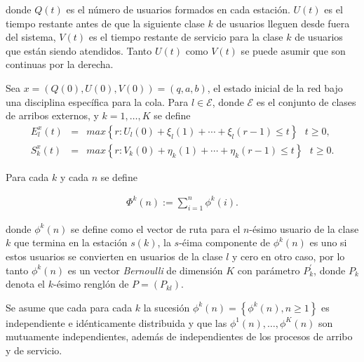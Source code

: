 \documentclass{article}
\begin{document}
donde $Q\left(t\right)$ es el n\'umero de usuarios formados en
cada estaci\'on. $U\left(t\right)$ es el tiempo restante antes de
que la siguiente clase $k$ de usuarios lleguen desde fuera del
sistema, $V\left(t\right)$ es el tiempo restante de servicio para
la clase $k$ de usuarios que est\'an siendo atendidos. Tanto
$U\left(t\right)$ como $V\left(t\right)$ se puede asumir que son
continuas por la derecha.

Sea
$x=\left(Q\left(0\right),U\left(0\right),V\left(0\right)\right)=\left(q,a,b\right)$,
el estado inicial de la red bajo una disciplina espec\'ifica para
la cola. Para $l\in\mathcal{E}$, donde $\mathcal{E}$ es el conjunto de clases de arribos externos, y $k=1,\ldots,K$ se define\\
\begin{eqnarray*}
E_{l}^{x}\left(t\right)&=&max\left\{r:U_{l}\left(0\right)+\xi_{l}\left(1\right)+\cdots+\xi_{l}\left(r-1\right)\leq
t\right\}\textrm{   }t\geq0,\\
S_{k}^{x}\left(t\right)&=&max\left\{r:V_{k}\left(0\right)+\eta_{k}\left(1\right)+\cdots+\eta_{k}\left(r-1\right)\leq
t\right\}\textrm{   }t\geq0.
\end{eqnarray*}

Para cada $k$ y cada $n$ se define

\begin{eqnarray*}\label{Eq.phi}
\Phi^{k}\left(n\right):=\sum_{i=1}^{n}\phi^{k}\left(i\right).
\end{eqnarray*}

donde $\phi^{k}\left(n\right)$ se define como el vector de ruta
para el $n$-\'esimo usuario de la clase $k$ que termina en la
estaci\'on $s\left(k\right)$, la $s$-\'eima componente de
$\phi^{k}\left(n\right)$ es uno si estos usuarios se convierten en
usuarios de la clase $l$ y cero en otro caso, por lo tanto
$\phi^{k}\left(n\right)$ es un vector {\em Bernoulli} de
dimensi\'on $K$ con par\'ametro $P_{k}^{'}$, donde $P_{k}$ denota
el $k$-\'esimo rengl\'on de $P=\left(P_{kl}\right)$.

Se asume que cada para cada $k$ la sucesi\'on $\phi^{k}\left(n\right)=\left\{\phi^{k}\left(n\right),n\geq1\right\}$
es independiente e id\'enticamente distribuida y que las
$\phi^{1}\left(n\right),\ldots,\phi^{K}\left(n\right)$ son
mutuamente independientes, adem\'as de independientes de los
procesos de arribo y de servicio.\\
\end{document}
